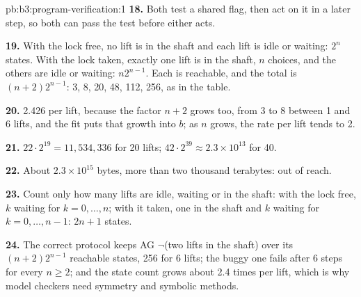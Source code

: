 \begin{solution}{pb:b3:program-verification:1}
\textbf{18.} Both test a shared flag, then act on it in a later step, so both can pass the test before either acts.

\textbf{19.} With the lock free, no lift is in the shaft and each lift is idle or waiting: $2^n$ states. With the lock taken, exactly one lift is in the shaft, $n$ choices, and the others are idle or waiting: $n 2^{n-1}$. Each is reachable, and the total is $(n + 2) 2^{n - 1}$: 3, 8, 20, 48, 112, 256, as in the table.

\textbf{20.} 2.426 per lift, because the factor $n + 2$ grows too, from 3 to 8 between 1 and 6 lifts, and the fit puts that growth into $b$; as $n$ grows, the rate per lift tends to 2.

\textbf{21.} $22 \cdot 2^{19} = 11{,}534{,}336$ for 20 lifts; $42 \cdot 2^{39} \approx 2.3 \times 10^{13}$ for 40.

\textbf{22.} About $2.3 \times 10^{15}$ bytes, more than two thousand terabytes: out of reach.

\textbf{23.} Count only how many lifts are idle, waiting or in the shaft: with the lock free, $k$ waiting for $k = 0, \ldots, n$; with it taken, one in the shaft and $k$ waiting for $k = 0, \ldots, n - 1$: $2n + 1$ states.

\textbf{24.} The correct protocol keeps AG $\neg$(two lifts in the shaft) over its $(n + 2)2^{n-1}$ reachable states, 256 for 6 lifts; the buggy one fails after 6 steps for every $n \ge 2$; and the state count grows about 2.4 times per lift, which is why model checkers need symmetry and symbolic methods.
\end{solution}
